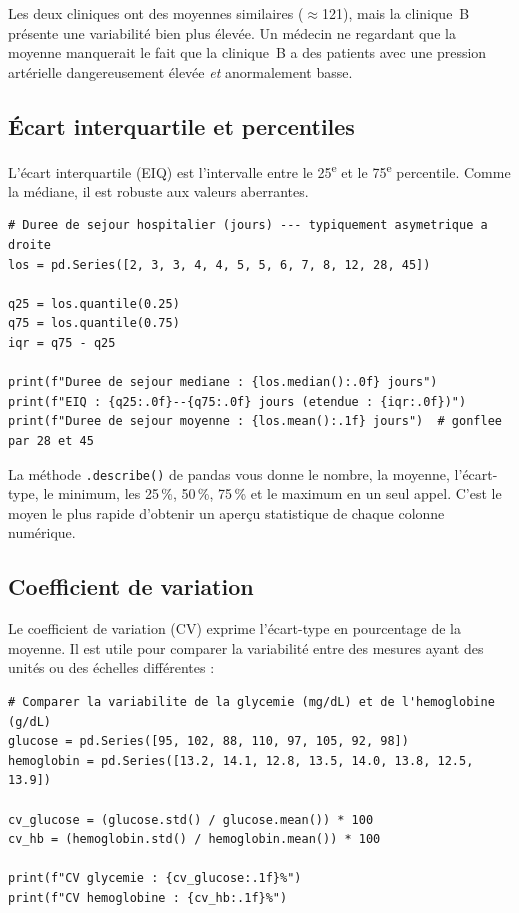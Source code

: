 Les deux cliniques ont des moyennes similaires ($\approx$121), mais la clinique~B pr\'esente une variabilit\'e bien plus \'elev\'ee. Un m\'edecin ne regardant que la moyenne manquerait le fait que la clinique~B a des patients avec une pression art\'erielle dangereusement \'elev\'ee \emph{et} anormalement basse.

\subsection{\'Ecart interquartile et percentiles}

L'\'ecart interquartile (EIQ) est l'intervalle entre le 25\textsuperscript{e} et le 75\textsuperscript{e} percentile. Comme la m\'ediane, il est robuste aux valeurs aberrantes.

\begin{verbatim}
# Duree de sejour hospitalier (jours) --- typiquement asymetrique a droite
los = pd.Series([2, 3, 3, 4, 4, 5, 5, 6, 7, 8, 12, 28, 45])

q25 = los.quantile(0.25)
q75 = los.quantile(0.75)
iqr = q75 - q25

print(f"Duree de sejour mediane : {los.median():.0f} jours")
print(f"EIQ : {q25:.0f}--{q75:.0f} jours (etendue : {iqr:.0f})")
print(f"Duree de sejour moyenne : {los.mean():.1f} jours")  # gonflee par 28 et 45
\end{verbatim}

\begin{pythontip}
La m\'ethode \texttt{.describe()} de pandas vous donne le nombre, la moyenne, l'\'ecart-type, le minimum, les 25\,\%, 50\,\%, 75\,\% et le maximum en un seul appel. C'est le moyen le plus rapide d'obtenir un aper\c{c}u statistique de chaque colonne num\'erique.
\end{pythontip}

\subsection{Coefficient de variation}

Le coefficient de variation (CV) exprime l'\'ecart-type en pourcentage de la moyenne. Il est utile pour comparer la variabilit\'e entre des mesures ayant des unit\'es ou des \'echelles diff\'erentes :

\begin{verbatim}
# Comparer la variabilite de la glycemie (mg/dL) et de l'hemoglobine (g/dL)
glucose = pd.Series([95, 102, 88, 110, 97, 105, 92, 98])
hemoglobin = pd.Series([13.2, 14.1, 12.8, 13.5, 14.0, 13.8, 12.5, 13.9])

cv_glucose = (glucose.std() / glucose.mean()) * 100
cv_hb = (hemoglobin.std() / hemoglobin.mean()) * 100

print(f"CV glycemie : {cv_glucose:.1f}%")
print(f"CV hemoglobine : {cv_hb:.1f}%")
\end{verbatim}

